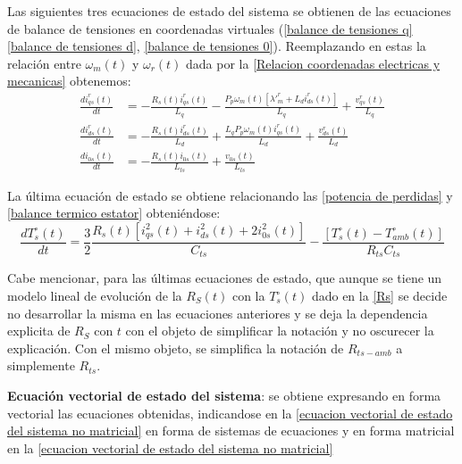 \documentclass[a4paper, 10pt, onecolumn,journal]{ieeeconf}
\begin{document}
Las siguientes tres ecuaciones de estado del sistema se obtienen de las ecuaciones de balance de tensiones
en coordenadas virtuales (\cref{balance de tensiones q} \cref{balance de tensiones d}, \cref{balance de tensiones 0}).
Reemplazando en estas la relación entre $\omega_m(t)$ y $\omega_r(t)$ dada por la \cref{Relacion coordenadas electricas y mecanicas} obtenemos:
\begin{align}
    \frac{d i^r_{qs}(t)}{dt} &= -\frac{R_s(t) i^r_{qs}(t)}{L_q} - \frac{P_p \omega_m(t) \left[\lambda'^r_m + L_d i^r_{ds}(t)\right]}{L_q} + \frac{v^r_{qs}(t)}{L_q} \label{ecuacion de estado iqs}\\
    \frac{d i^r_{ds}(t)}{dt} &= -\frac{R_s(t) i^r_{ds}(t)}{L_d} + \frac{L_q P_p \omega_m(t)i^r_{qs}(t)}{L_d}  + \frac{v^r_{ds}(t)}{L_d} \label{ecuacion de estado ids}\\ 
    \frac{d i_{0s}(t)}{dt}   &= -\frac{R_s(t) i_{0s}(t)}{L_{ls}} + \frac{v_{0s}(t)}{L_{ls}}\label{ecuacion de estado i0s}
\end{align}

La última ecuación de estado se obtiene relacionando las \cref{potencia de perdidas} y \cref{balance termico estator} obteniéndose:
\begin{equation}
    \frac{d T^\circ_s(t)}{dt} = \frac{3}{2} \frac{R_s(t) \left[ i_{qs}^2(t) + i_{ds}^2(t) + 2 i_{0s}^2(t) \right]}{C_{ts}} - \frac{\left[T_s^{\circ}(t) - T_{amb}^{\circ}(t)\right]}{R_{ts}C_{ts}} 
    \label{ecuacion de estado Ts}
\end{equation}

Cabe mencionar, para las últimas ecuaciones de estado, que aunque se tiene un modelo lineal de evolución de la $R_S(t)$ con la $T^\circ_s(t)$ dado en la \cref{Rs}
se decide no desarrollar la misma en las ecuaciones anteriores y se deja la dependencia explicita de $R_S$ con $t$ con el objeto de simplificar la notación
y no oscurecer la explicación. Con el mismo objeto, se simplifica la notación de $R_{ts-amb}$ a simplemente $R_{ts}$.

\textbf{Ecuación vectorial de estado del sistema}: se obtiene expresando en forma vectorial las ecuaciones obtenidas, indicandose en la \cref{ecuacion vectorial de estado del sistema no matricial}
en forma de sistemas de ecuaciones y en forma matricial en la \cref{ecuacion vectorial de estado del sistema no matricial}
\end{document}
